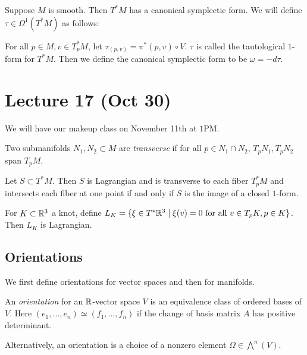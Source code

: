 \documentclass[twoside, 10pt]{article}
\begin{document}
    \begin{exm} Suppose $M$ is smooth. Then $T^*M$ has a canonical symplectic
        form. We will define $\tau \in \Omega^1(T^*M)$ as follows:

        For all $p \in M, v\in T^*_p M$, let $\tau_{(p,v)} = \pi^*(p,v) \circ
    V$. $\tau$ is called the tautological $1$-form for $T^*M$. Then we define
the canonical symplectic form to be $\omega = -d\tau$.  \end{exm}

    \section{Lecture 17 (Oct 30)}%
    
    We will have our makeup class on November 11th at $1$PM.

    \begin{defn} Two submanifolds $N_1,N_2 \subset M$ are \textit{transverse}
    if for all $p \in N_1 \cap N_2$, $T_pN_1, T_pN_2$ span $T_pM$.  \end{defn}

    \begin{exer}[Homework] Let $S \subset T^*M$. Then $S$ is Lagrangian and is
    transverse to each fiber $T_p^*M$ and intersects each fiber at one point if
and only if $S$ is the image of a closed $1$-form.  \end{exer}

    \begin{exm} For $K \subset \mathbb{R}^3$ a knot, define $L_K = \{ \xi \in T^*\mathbb{R}^3
    \mid \xi(v) = 0 \text{ for all } v \in T_pK, p \in K\}$. Then $L_K$ is
Lagrangian.  \end{exm}

    \subsection{Orientations}%
    
    We first define orientations for vector spaces and then for manifolds.

    \begin{defn} An \textit{orientation} for an $\mathbb{R}$-vector space $V$ is an
    equivalence class of ordered bases of $V$. Here $(e_1, \ldots, e_n) \simeq
(f_1, \ldots, f_n)$ if the change of basis matrix $A$ has positive determinant.
\end{defn}

    \begin{lem} Alternatively, an orientation is a choice of a nonzero element
    $\Omega \in \bigwedge^n(V)$.  \end{lem}
\end{document}
